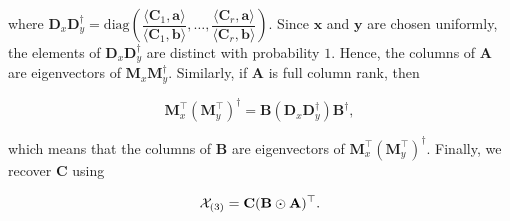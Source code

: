 where $\mathbf{D}_x \mathbf{D}_y^\dag = \mathrm{diag}\left(\dfrac{\langle \mathbf{C}_1, \mathbf{a} \rangle}{\langle \mathbf{C}_1, \mathbf{b} \rangle},\ldots, \dfrac{\langle \mathbf{C}_r, \mathbf{a} \rangle}{\langle \mathbf{C}_r, \mathbf{b} \rangle}\right)$. Since $\mathbf{x}$ and $\mathbf{y}$ are chosen uniformly, the elements of $\mathbf{D}_x \mathbf{D}_y^\dag$ are distinct with probability $1$. Hence, the columns of $\mathbf{A}$ are eigenvectors of $\mathbf{M}_x\mathbf{M}_y^\dag$. Similarly, if $\mathbf{A}$ is full column rank, then

\begin{equation}
    \mathbf{M}_x^\top (\mathbf{M}_y^\top)^\dag = \mathbf{B}(\mathbf{D}_x \mathbf{D}_y^\dag) \mathbf{B}^\dag,
\end{equation}

which means that the columns of $\mathbf{B}$ are eigenvectors of $\mathbf{M}_x^\top (\mathbf{M}_y^\top)^\dag$. Finally, we recover $\mathbf{C}$ using

\begin{equation}
    \mathcal{X}_{(3)} = \mathbf{C}(\mathbf{B}\odot \mathbf{A})^\top.
\end{equation}
